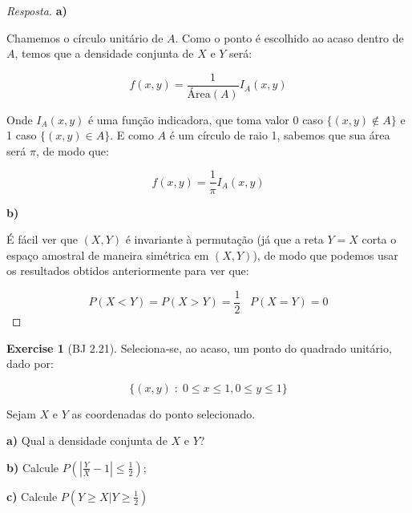 \documentclass[
]{article}
\theoremstyle{definition}
\theoremstyle{definition}
\theoremstyle{definition}
\newtheorem{exercise}{Exercise}[section]
\theoremstyle{definition}
\theoremstyle{remark}
\begin{document}
\begin{proof}[Resposta]
\textbf{a)}

Chamemos o círculo unitário de \(A\). Como o ponto é escolhido ao acaso dentro de \(A\), temos que a densidade conjunta de \(X\) e \(Y\) será:

\begin{equation*}
f(x,y) = \frac{1}{\text{Área}(A)}I_{A}(x,y)
\end{equation*}

Onde \(I_{A}(x,y)\) é uma função indicadora, que toma valor 0 caso \(\{(x,y) \not\in A\}\) e 1 caso \(\{(x,y) \in A\}\). E como \(A\) é um círculo de raio 1, sabemos que sua área será \(\pi\), de modo que:

\begin{equation*}
f(x,y) = \frac{1}{\pi}I_{A}(x,y)
\end{equation*}

\textbf{b)}

É fácil ver que \((X,Y)\) é invariante à permutação (já que a reta \(Y = X\) corta o espaço amostral de maneira simétrica em \((X,Y)\)), de modo que podemos usar os resultados obtidos anteriormente para ver que:

\begin{equation*}
P(X < Y) = P(X > Y) = \frac{1}{2} \;\;\; P(X = Y) = 0
\end{equation*}
\end{proof}

\begin{exercise}[BJ 2.21]
Seleciona-se, ao acaso, um ponto do quadrado unitário, dado por:

\begin{equation*}
\{(x,y) \; : \; 0 \le x \le 1, 0 \le y \le 1\}
\end{equation*}

Sejam \(X\) e \(Y\) as coordenadas do ponto selecionado.

\textbf{a)} Qual a densidade conjunta de \(X\) e \(Y\)?

\textbf{b)} Calcule \(P\left(\left|\frac{Y}{X} - 1\right|\le \frac{1}{2}\right)\);

\textbf{c)} Calcule \(P\left(Y \ge X | Y \ge \frac{1}{2}\right)\)
\end{exercise}
\end{document}
